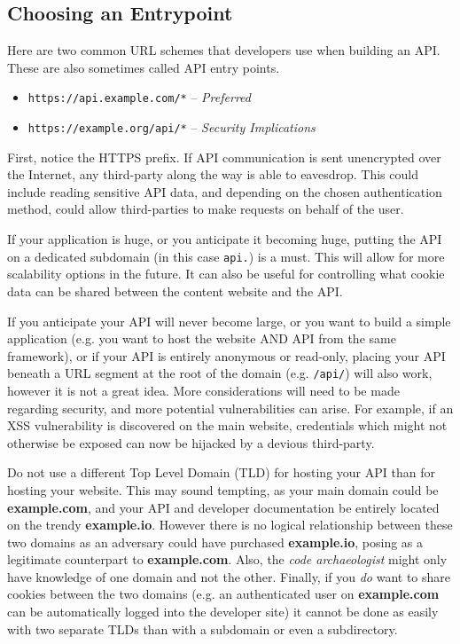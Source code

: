 \documentclass{book}
\begin{document}
\subsection{Choosing an Entrypoint}

Here are two common URL schemes that developers use when building an API. These are also sometimes called API entry points.

\begin{itemize}
\item \texttt{https://api.example.com/*} -- \emph{Preferred}
\item \texttt{https://example.org/api/*} -- \emph{Security Implications}
\end{itemize}

First, notice the HTTPS prefix. If API communication is sent unencrypted over the Internet, any third-party along the way is able to eavesdrop. This could include reading sensitive API data, and depending on the chosen authentication method, could allow third-parties to make requests on behalf of the user.

If your application is huge, or you anticipate it becoming huge, putting the API on a dedicated subdomain (in this case \texttt{api.}) is a must. This will allow for more scalability options in the future. It can also be useful for controlling what cookie data can be shared between the content website and the API.

If you anticipate your API will never become large, or you want to build a simple application (e.g. you want to host the website AND API from the same framework), or if your API is entirely anonymous or read-only, placing your API beneath a URL segment at the root of the domain (e.g. \texttt{/api/}) will also work, however it is not a great idea. More considerations will need to be made regarding security, and more potential vulnerabilities can arise. For example, if an XSS vulnerability is discovered on the main website, credentials which might not otherwise be exposed can now be hijacked by a devious third-party.

Do not use a different Top Level Domain (TLD) for hosting your API than for hosting your website. This may sound tempting, as your main domain could be \textbf{example.com}, and your API and developer documentation be entirely located on the trendy \textbf{example.io}. However there is no logical relationship between these two domains as an adversary could have purchased \textbf{example.io}, posing as a legitimate counterpart to \textbf{example.com}. Also, the \emph{code archaeologist} might only have knowledge of one domain and not the other. Finally, if you \emph{do} want to share cookies between the two domains (e.g. an authenticated user on \textbf{example.com} can be automatically logged into the developer site) it cannot be done as easily with two separate TLDs than with a subdomain or even a subdirectory.
\end{document}
